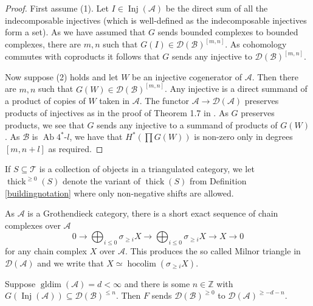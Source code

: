 \documentclass[12pt,oneside]{amsart}
\DeclareMathOperator*{\Inj}{Inj}
\DeclareMathOperator*{\hocolim}{hocolim}
\DeclareMathOperator{\thick}{thick}
\DeclareMathOperator{\gldim}{gldim}
\DeclareMathOperator{\Ab}{Ab}
\begin{document}
\begin{proof}
First assume (1). Let $I \in \Inj(\mathcal{A})$ be the direct sum of all the indecomposable injectives (which is well-defined as the indecomposable injectives form a set). As we have assumed that $G$ sends bounded complexes to bounded complexes, there are $m,n$ such that $G(I) \in \mathcal{D}(\mathcal{B})^{[m,n]}$. As cohomology commutes with coproducts it follows that $G$ sends any injective to $\mathcal{D}(\mathcal{B})^{[m,n]}$.

Now suppose (2) holds and let $W$ be an injective cogenerator of $\mathcal{A}$. Then there are $m,n$ such that $G(W) \in \mathcal{D}(\mathcal{B})^{[m,n]}$. Any injective is a direct summand of a product of copies of $W$ taken in $\mathcal{A}$. The functor $\mathcal{A} \to \mathcal{D}(\mathcal{A})$ preserves products of injectives as in the proof of Theorem 1.7 in \cite{Sto13}. As $G$ preserves products, we see that $G$ sends any injective to a summand of products of $G(W)$. As $\mathcal{B}$ is $\Ab4^\ast$-$l$, we have that $H^\ast(\prod G(W))$ is non-zero only in degrees $[m,n + l]$  as required.
\end{proof}

If $S \subseteq \mathcal{T}$ is a collection of objects in a triangulated category, we let $\thick^{\geq 0}(S)$ denote the variant of $\thick(S)$ from Definition \ref{buildingnotation} where only non-negative shifts are allowed.  

\begin{remark} \label{milnor}
As $\mathcal{A}$ is a Grothendieck category, there is a short exact sequence of chain complexes over $\mathcal{A}$
\[
0 \to \bigoplus_{i \leq 0} \sigma_{\geq i} X \to \bigoplus_{i \leq 0} \sigma_{\geq i} X \to X \to 0 
\]
for any chain complex $X$ over $\mathcal{A}$. This produces the so called Milnor triangle in $\mathcal{D}(\mathcal{A})$ and we write that $X \simeq \hocolim(\sigma_{\geq i} X)$. 
\end{remark}

\begin{lemma} \label{bigmoritalemma1}
Suppose $\gldim(\mathcal{A}) = d < \infty$ and there is some $n \in \mathbb{Z}$ with $G(\Inj(\mathcal{A})) \subseteq \mathcal{D}(\mathcal{B})^{\leq n}$. Then $F$ sends $\mathcal{D}(\mathcal{B})^{\geq 0}$ to $\mathcal{D}(\mathcal{A})^{\geq -d-n}$. 
\end{lemma}
\end{document}
